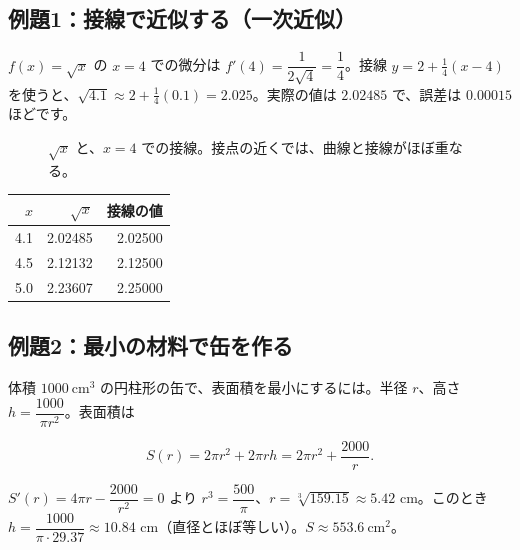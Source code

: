 \documentclass[a4paper,11pt,openany]{ltjsbook}
\begin{document}
\subsection*{例題1：接線で近似する（一次近似）}

$f(x)=\sqrt x$ の $x=4$ での微分は $f'(4)=\dfrac1{2\sqrt4}=\dfrac14$。接線 $y=2+\frac14(x-4)$ を使うと、$\sqrt{4.1}\approx2+\frac14(0.1)=2.025$。実際の値は $2.02485$ で、誤差は $0.00015$ ほどです。

\begin{figure}[htbp]
\centering
{}
\caption{$\sqrt x$ と、$x=4$ での接線。接点の近くでは、曲線と接線がほぼ重なる。}
\end{figure}

\begin{center}
\begin{tabular}{rrr}
\toprule
$x$ & $\sqrt x$ & 接線の値\\
\midrule
4.1 & 2.02485 & 2.02500\\
4.5 & 2.12132 & 2.12500\\
5.0 & 2.23607 & 2.25000\\
\bottomrule
\end{tabular}
\end{center}

\subsection*{例題2：最小の材料で缶を作る}

体積 $1000\ \mathrm{cm^3}$ の円柱形の缶で、表面積を最小にするには。半径 $r$、高さ $h=\dfrac{1000}{\pi r^2}$。表面積は

\[
S(r)=2\pi r^2+2\pi rh=2\pi r^2+\frac{2000}{r}.
\]

$S'(r)=4\pi r-\dfrac{2000}{r^2}=0$ より $r^3=\dfrac{500}{\pi}$、$r=\sqrt[3]{159.15}\approx5.42$ cm。このとき $h=\dfrac{1000}{\pi\cdot29.37}\approx10.84$ cm（直径とほぼ等しい）。$S\approx553.6\ \mathrm{cm^2}$。
\end{document}
